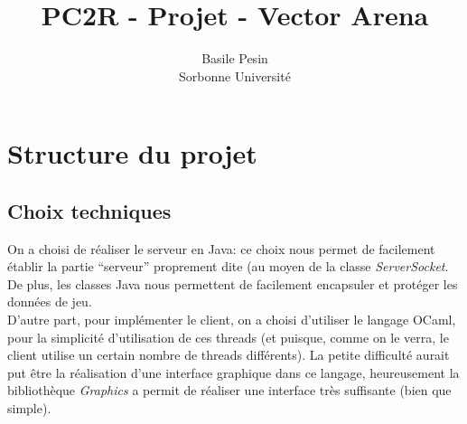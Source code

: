 \documentclass{article}
\title{PC2R - Projet - Vector Arena}
\author{Basile Pesin\\Sorbonne Université}
\begin{document}
\maketitle


\section{Structure du projet}

\subsection{Choix techniques}
On a choisi de réaliser le serveur en Java: ce choix nous permet de facilement établir la partie ``serveur'' proprement dite (au moyen de la classe \textit{ServerSocket}. De plus, les classes Java nous permettent de facilement encapsuler et protéger les données de jeu.\\
D'autre part, pour implémenter le client, on a choisi d'utiliser le langage OCaml, pour la simplicité d'utilisation de ces threads (et puisque, comme on le verra, le client utilise un certain nombre de threads différents). La petite difficulté aurait put être la réalisation d'une interface graphique dans ce langage, heureusement la bibliothèque \textit{Graphics} a permit de réaliser une interface très suffisante (bien que simple).
\end{document}
